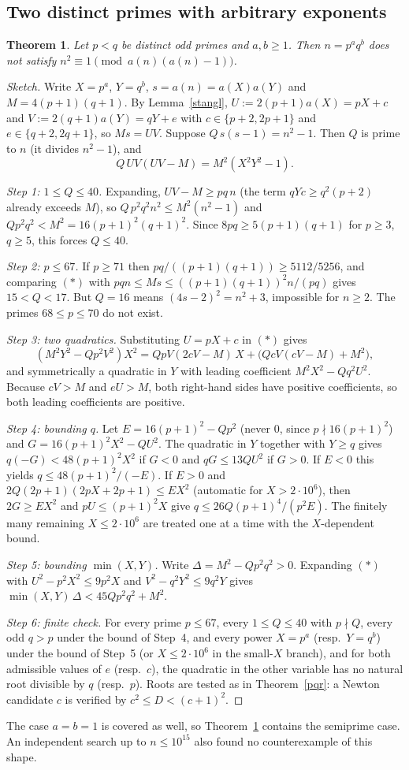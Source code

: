 \documentclass[11pt]{article}
\newtheorem{theorem}{Theorem}
\theoremstyle{remark}\newtheorem{remark}[theorem]{Remark}
\begin{document}
\subsection{Two distinct primes with arbitrary exponents}
\begin{theorem}\label{ppq}
Let $p<q$ be distinct odd primes and $a,b\ge1$. Then $n=p^aq^b$ does not satisfy $n^2\equiv1\pmod{a(n)(a(n)-1)}$.
\end{theorem}
\begin{proof}[Sketch]
Write $X=p^a$, $Y=q^b$, $s=a(n)=a(X)a(Y)$ and $M=4(p+1)(q+1)$. By Lemma~\ref{stangl}, $U:=2(p+1)a(X)=pX+c$ and $V:=2(q+1)a(Y)=qY+e$ with $c\in\{p+2,2p+1\}$ and $e\in\{q+2,2q+1\}$, so $Ms=UV$. Suppose $Q\,s(s-1)=n^2-1$. Then $Q$ is prime to $n$ (it divides $n^2-1$), and
\[Q\,UV(UV-M)=M^2(X^2Y^2-1). \tag{$*$}\]

\emph{Step 1: $1\le Q\le 40$.} Expanding, $UV-M\ge pq\,n$ (the term $qYc\ge q^2(p+2)$ already exceeds $M$), so $Q\,p^2q^2n^2\le M^2(n^2-1)$ and $Qp^2q^2<M^2=16(p+1)^2(q+1)^2$. Since $8pq\ge5(p+1)(q+1)$ for $p\ge3$, $q\ge5$, this forces $Q\le40$.

\emph{Step 2: $p\le67$.} If $p\ge71$ then $pq/((p+1)(q+1))\ge 5112/5256$, and comparing $(*)$ with $pqn\le Ms\le ((p+1)(q+1))^2n/(pq)$ gives $15<Q<17$. But $Q=16$ means $(4s-2)^2=n^2+3$, impossible for $n\ge2$. The primes $68\le p\le70$ do not exist.

\emph{Step 3: two quadratics.} Substituting $U=pX+c$ in $(*)$ gives
\[(M^2Y^2-Qp^2V^2)X^2=QpV(2cV-M)\,X+\bigl(QcV(cV-M)+M^2\bigr),\]
and symmetrically a quadratic in $Y$ with leading coefficient $M^2X^2-Qq^2U^2$. Because $cV>M$ and $eU>M$, both right-hand sides have positive coefficients, so both leading coefficients are positive.

\emph{Step 4: bounding $q$.} Let $E=16(p+1)^2-Qp^2$ (never $0$, since $p\nmid16(p+1)^2$) and $G=16(p+1)^2X^2-QU^2$. The quadratic in $Y$ together with $Y\ge q$ gives $q(-G)<48(p+1)^2X^2$ if $G<0$ and $qG\le13QU^2$ if $G>0$. If $E<0$ this yields $q\le 48(p+1)^2/(-E)$. If $E>0$ and $2Q(2p+1)(2pX+2p+1)\le EX^2$ (automatic for $X>2\cdot10^6$), then $2G\ge EX^2$ and $pU\le(p+1)^2X$ give $q\le 26Q(p+1)^4/(p^2E)$. The finitely many remaining $X\le2\cdot10^6$ are treated one at a time with the $X$-dependent bound.

\emph{Step 5: bounding $\min(X,Y)$.} Write $\Delta=M^2-Qp^2q^2>0$. Expanding $(*)$ with $U^2-p^2X^2\le9p^2X$ and $V^2-q^2Y^2\le9q^2Y$ gives $\min(X,Y)\,\Delta<45Qp^2q^2+M^2$.

\emph{Step 6: finite check.} For every prime $p\le67$, every $1\le Q\le40$ with $p\nmid Q$, every odd $q>p$ under the bound of Step~4, and every power $X=p^a$ (resp.\ $Y=q^b$) under the bound of Step~5 (or $X\le2\cdot10^6$ in the small-$X$ branch), and for both admissible values of $e$ (resp.\ $c$), the quadratic in the other variable has no natural root divisible by $q$ (resp.\ $p$). Roots are tested as in Theorem~\ref{pqr}: a Newton candidate $c$ is verified by $c^2\le D<(c+1)^2$.
\end{proof}
\noindent The case $a=b=1$ is covered as well, so Theorem~\ref{ppq} contains the semiprime case. An independent search up to $n\le10^{15}$ also found no counterexample of this shape.
\end{document}
